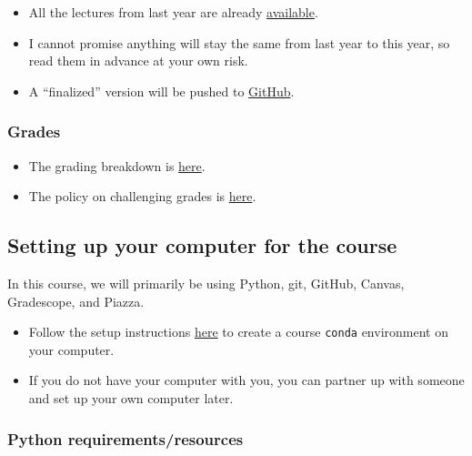 \documentclass[11pt]{article}
\providecommand{\tightlist}{%
      \setlength{\itemsep}{0pt}\setlength{\parskip}{0pt}}
\begin{document}
\begin{itemize}
\tightlist
\item
  All the lectures from last year are already
  \href{https://github.com/UBC-CS/cpsc330-2023W1}{available}.
\item
  I cannot promise anything will stay the same from last year to this
  year, so read them in advance at your own risk.
\item
  A ``finalized'' version will be pushed to
  \href{https://github.com/UBC-CS/cpsc330-2023W2/}{GitHub}.
\end{itemize}

    \subsubsection{Grades}\label{grades}

\begin{itemize}
\tightlist
\item
  The grading breakdown is
  \href{https://github.com/UBC-CS/cpsc330-2023W2/blob/main/syllabus.md\#Grading-scheme}{here}.
\item
  The policy on challenging grades is
  \href{https://github.com/UBC-CS/cpsc330-2023W2/blob/master/docs/grades.md}{here}.
\end{itemize}

    \subsection{Setting up your computer for the
course}\label{setting-up-your-computer-for-the-course}

    In this course, we will primarily be using Python, git, GitHub, Canvas,
Gradescope, and Piazza.

\begin{itemize}
\tightlist
\item
  Follow the setup instructions
  \href{https://github.com/UBC-CS/cpsc330-2023W2//blob/main/docs/setup.md}{here}
  to create a course \texttt{conda} environment on your computer.
\item
  If you do not have your computer with you, you can partner up with
  someone and set up your own computer later.
\end{itemize}

    \subsubsection{Python
requirements/resources}\label{python-requirementsresources}
\end{document}
